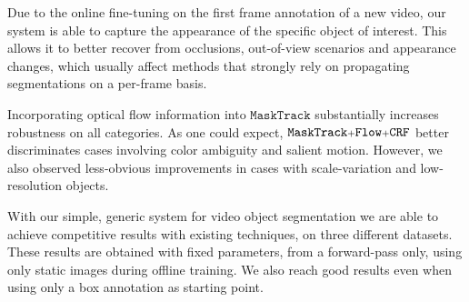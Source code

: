 \documentclass[10pt,twocolumn,letterpaper]{article}
\makeatletter
\renewcommand{\paragraph}{\@startsection{paragraph}{4}{\z@}{0.5ex \@plus 1ex \@minus .2ex}{-0.5em}{\normalfont \normalsize \bfseries}}
\makeatother
\begin{document}
Due to the online fine-tuning on the first frame annotation of a new video, our system is able to capture the appearance of the specific object of interest. 
This allows it to better recover from occlusions, out-of-view scenarios and appearance changes, which usually affect methods that strongly rely on propagating segmentations on a per-frame basis.

Incorporating optical flow information into $\mathtt{MaskTrack}$ substantially increases
robustness on all categories. As one could expect, $\mathtt{MaskTrack\mathsmaller{+}Flow \mathsmaller{+}CRF}$ better discriminates cases
involving color ambiguity and salient motion. However, we also observed less-obvious improvements in cases with scale-variation and low-resolution objects. 


















 

\paragraph{Conclusion}
With our simple, generic system for video object segmentation we are able to achieve competitive results with existing techniques, on three different datasets.
These results are obtained with fixed parameters, from a forward-pass only, using only static images during offline training. We also reach good results even when using only a box annotation as starting point.
\end{document}
